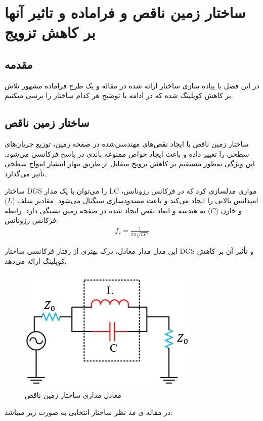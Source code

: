 \newpage 
\chapter{ ساختار زمین ناقص و فراماده و تاثیر آنها بر کاهش تزویج}
\label{ch:3}
\section{مقدمه}
در این فصل با پیاده سازی ساختار ارائه شده در مقاله
\cite{carver1981microstrip}
و یک طرح فراماده مشهور تلاش بر کاهش کوپلینگ شده که در ادامه با توضیح هر کدام ساختار را برسی میکنیم.

\section{ساختار زمین ناقص}
ساختار زمین ناقص  با ایجاد نقص‌های مهندسی‌شده در صفحه زمین، توزیع جریان‌های سطحی را تغییر داده و باعث ایجاد خواص ممنوعه باندی
 در پاسخ فرکانسی می‌شود. این ویژگی به‌طور مستقیم بر کاهش تزویج متقابل از طریق مهار انتشار امواج سطحی تأثیر می‌گذارد.
 
 
 ساختار DGS را می‌توان با یک مدار LC موازی مدلسازی کرد که در فرکانس رزونانس، امپدانس بالایی را ایجاد می‌کند و باعث مسدودسازی سیگنال می‌شود. مقادیر سلف ($L$) و خازن ($C$) به هندسه و ابعاد نقص ایجاد شده در صفحه زمین بستگی دارد.
 رابطه فرکانس رزونانس:
 \begin{align}
 	\label{eq:eq12}
	f_r = \frac{1}{2\pi\sqrt{LC}}
 \end{align}
 
 این مدل مدار معادل، درک بهتری از رفتار فرکانسی ساختار DGS و تأثیر آن بر کاهش کوپلینگ ارائه می‌دهد.
 
 
 \begin{figure}
	\centering
 	\includegraphics[scale=0.8]{Images/fig26.jpg}
 	\caption{معادل مداری ساختار زمین ناقص}
 	\label{fig26}
 \end{figure}
 
 در مقاله ی مد نظر ساختار انتخابی به صورت زیر میباشد: 
 
